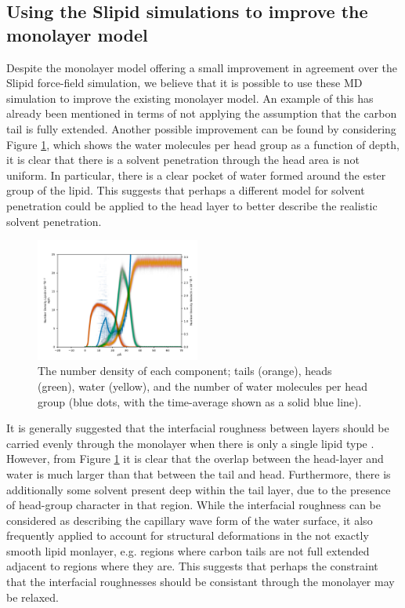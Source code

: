 \documentclass[amsmath,amssymb,twocolumn,superscriptaddress,aps,prl]{revtex4-1}
\begin{document}
\subsection{Using the Slipid simulations to improve the monolayer model}
Despite the monolayer model offering a small improvement in agreement over the Slipid force-field simulation, we believe that it is possible to use these MD simulation to improve the existing monolayer model.
An example of this has already been mentioned in terms of not applying the assumption that the carbon tail is fully extended.
Another possible improvement can be found by considering Figure \ref{fig:nb}, which shows the water molecules per head group as a function of depth, it is clear that there is a solvent penetration through the head area is not uniform.
In particular, there is a clear pocket of water formed around the ester group of the lipid.
This suggests that perhaps a different model for solvent penetration could be applied to the head layer to better describe the realistic solvent penetration.
%
\begin{figure}
\centering
  \includegraphics[width=0.48\textwidth]{figures/number_density}
  \caption{The number density of each component; tails (orange), heads (green), water (yellow), and the number of water molecules per head group (blue dots, with the time-average shown as a solid blue line).}
  \label{fig:nb}
\end{figure}
%

It is generally suggested that the interfacial roughness between layers should be carried evenly through the monolayer when there is only a single lipid type \cite{Campbell2018}.
However, from Figure \ref{fig:nb} it is clear that the overlap between the head-layer and water is much larger than that between the tail and head.
Furthermore, there is additionally some solvent present deep within the tail layer, due to the presence of head-group character in that region.
While the interfacial roughness can be considered as describing the capillary wave form of the water surface, it also frequently applied to account for structural deformations in the not exactly smooth lipid monlayer, e.g. regions where carbon tails are not full extended adjacent to regions where they are.
This suggests that perhaps the constraint that the interfacial roughnesses should be consistant through the monolayer may be relaxed.
\end{document}
